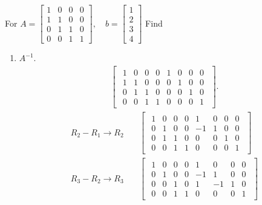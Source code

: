 \documentclass{zc-ust-hw}
\begin{document}
For
$A =
  \begin{bmatrix}
    1 & 0 & 0 & 0 \\
    1 & 1 & 0 & 0 \\
    0 & 1 & 1 & 0 \\
    0 & 0 & 1 & 1
  \end{bmatrix},
  \quad
  b = \begin{bmatrix} 1\\2\\3\\4 \end{bmatrix}$ Find

\begin{enumerate}[label=\roman*.]
  \item $A^{-1}$.
    \begin{align}
      \begin{bmatrix} 
        \begin{array}{cccc|cccc}
          1 & 0 & 0 & 0 & 1 & 0 & 0 & 0 \\
          1 & 1 & 0 & 0 & 0 & 1 & 0 & 0 \\
          0 & 1 & 1 & 0 & 0 & 0 & 1 & 0 \\
          0 & 0 & 1 & 1 & 0 & 0 & 0 & 1
        \end{array}
      \end{bmatrix} 
    .\end{align}
    \begin{align}
      R_2 - R_1 \rightarrow R_2
      &\quad
      \begin{bmatrix} 
        \begin{array}{cccc|cccc}
          1 & 0 & 0 & 0 & 1  & 0 & 0 & 0 \\
          0 & 1 & 0 & 0 & -1 & 1 & 0 & 0 \\
          0 & 1 & 1 & 0 & 0  & 0 & 1 & 0 \\
          0 & 0 & 1 & 1 & 0  & 0 & 0 & 1
        \end{array}
      \end{bmatrix} \\
      R_3 - R_2 \rightarrow R_3
      &\quad
      \begin{bmatrix} 
        \begin{array}{cccc|cccc}
          1 & 0 & 0 & 0 & 1  & 0  & 0 & 0 \\
          0 & 1 & 0 & 0 & -1 & 1  & 0 & 0 \\
          0 & 0 & 1 & 0 & 1  & -1 & 1 & 0 \\
          0 & 0 & 1 & 1 & 0  & 0  & 0 & 1
        \end{array}

\end{bmatrix}
\end{align}
\end{enumerate}
\end{document}
